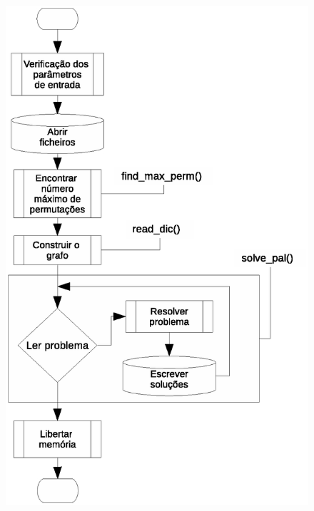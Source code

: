 \documentclass[a4paper, 18pt]{article}
\begin{document}
	\begin{figure}[H]
		\includegraphics[width=\linewidth]{arquitetura.eps}
	\end{figure}
\end{document}
